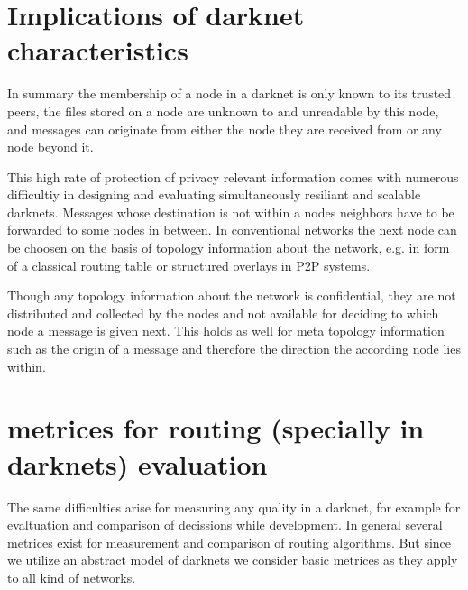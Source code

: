 \section{Implications of darknet characteristics}

In summary the membership of a node in a darknet is only known to its trusted peers, the files stored on a node are unknown to and unreadable by this node, and messages can originate from either the node they are received from or any node beyond it.

This high rate of protection of privacy relevant information comes with numerous difficultiy in designing and evaluating simultaneously resiliant and scalable darknets. Messages whose destination is not within a nodes neighbors have to be forwarded to some nodes in between. In conventional networks the next node can be choosen on the basis of topology information about the network, e.g. in form of a classical routing table or structured overlays in P2P systems.

Though any topology information about the network is confidential, they are not distributed and collected by the nodes and not available for deciding to which node a message is given next. This holds as well for meta topology information such as the origin of a message and therefore the direction the according node lies within.

\section{metrices for routing (specially in darknets) evaluation}

The same difficulties arise for measuring any quality in a darknet, for example for evaltuation and comparison of decissions while development. In general several metrices exist for measurement and comparison of routing algorithms. But since we utilize an abstract model of darknets we consider basic metrices as they apply to all kind of networks.


